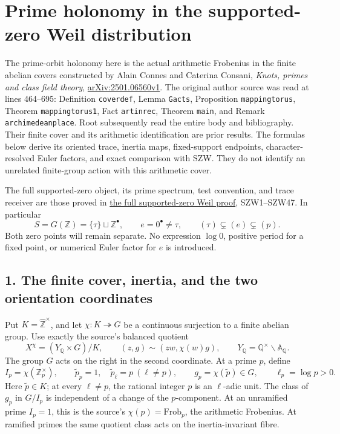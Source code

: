 \documentclass[
  10pt,
  a4paper,
]{article}
\author{}
\date{}
\begin{document}
{
\setcounter{tocdepth}{3}
\tableofcontents
}
\section{Prime holonomy in the supported-zero Weil
distribution}\label{prime-holonomy-in-the-supported-zero-weil-distribution}

The prime-orbit holonomy here is the actual arithmetic Frobenius in the
finite abelian covers constructed by Alain Connes and Caterina Consani,
\emph{Knots, primes and class field theory},
\href{https://arxiv.org/abs/2501.06560v1}{arXiv:2501.06560v1}. The
original author source was read at lines 464--695: Definition
\texttt{coverdef}, Lemma \texttt{Gacts}, Proposition
\texttt{mappingtorus}, Theorem \texttt{mappingtorus1}, Fact
\texttt{artinrec}, Theorem \texttt{main}, and Remark
\texttt{archimedeanplace}. Root subsequently read the entire body and
bibliography. Their finite cover and its arithmetic identification are
prior results. The formulas below derive its oriented trace, inertia
maps, fixed-support endpoints, character-resolved Euler factors, and
exact comparison with SZW. They do not identify an unrelated
finite-group action with this arithmetic cover.

The full supported-zero object, its prime spectrum, test convention, and
trace receiver are those proved in
\href{https://github.com/KokunoYumeto/zeta-function-research-reader/blob/adfbfe74fa49e31cb7aa068cf755fb083be37c32/workbenches/splitzero-tandem/branches/tau-zero-prime-positivity/SUPPORTED_ZERO_PRIME_WEIL_DERIVATION.md}{the
full supported-zero Weil proof}, SZW1--SZW47. In particular \[
S=G(\mathbb Z)=\{\tau\}\sqcup\mathbb Z^\bullet,
\qquad e=0^\bullet\ne\tau,
\qquad(\tau)\subsetneq(e)\subsetneq(p).
\tag{PHW1}
\] Both zero points will remain separate. No expression \(\log0\),
positive period for a fixed point, or numerical Euler factor for \(e\)
is introduced.

\subsection{1. The finite cover, inertia, and the two orientation
coordinates}\label{the-finite-cover-inertia-and-the-two-orientation-coordinates}

Put \(K=\widehat{\mathbb Z}^{\times}\), and let
\(\chi:K\twoheadrightarrow G\) be a continuous surjection to a finite
abelian group. Use exactly the source's balanced quotient \[
X^\chi=(Y_{\mathbb Q}\times G)/K,
\qquad (z,g)\sim(zw,\chi(w)g),
\qquad Y_{\mathbb Q}=\mathbb Q^\times\backslash\mathbb A_{\mathbb Q}.
\tag{PHW2}
\] The group \(G\) acts on the right in the second coordinate. At a
prime \(p\), define \[
I_p=\chi(\mathbb Z_p^\times),\qquad
\widetilde p_p=1,\quad \widetilde p_\ell=p\ (\ell\ne p),
\qquad g_p=\chi(\widetilde p)\in G,
\qquad \ell_p=\log p>0.
\tag{PHW3}
\] Here \(\widetilde p\in K\); at every \(\ell\ne p\), the rational
integer \(p\) is an \(\ell\)-adic unit. The class of \(g_p\) in
\(G/I_p\) is independent of a change of the \(p\)-component. At an
unramified prime \(I_p=1\), this is the source's
\(\chi(p)=\mathrm{Frob}_p\), the arithmetic Frobenius. At ramified
primes the same quotient class acts on the inertia-invariant fibre.
\end{document}
